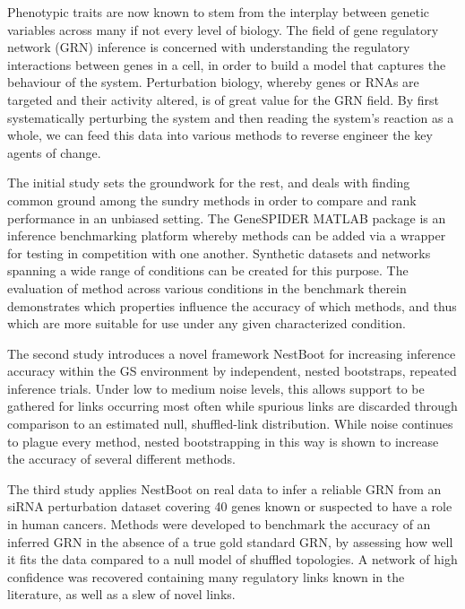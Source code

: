 
\begin{abstracts}

Phenotypic traits are now known to stem from the interplay between genetic variables across many if not every level of biology. The field of gene regulatory network (GRN) inference is concerned with understanding the regulatory interactions between genes in a cell, in order to build a model that captures the behaviour of the system. Perturbation biology, whereby genes or RNAs are targeted and their activity altered, is of great value for the GRN field. By first systematically perturbing the system and then reading the system's reaction as a whole, we can feed this data into various methods to reverse engineer the key agents of change. 

The initial study sets the groundwork for the rest, and deals with finding common ground among the sundry methods in order to compare and rank performance in an unbiased setting. The GeneSPIDER MATLAB package is an inference benchmarking platform whereby methods can be added via a wrapper for testing in competition with one another. Synthetic datasets and networks spanning a wide range of conditions can be created for this purpose. The evaluation of method across various conditions in the benchmark therein demonstrates which properties influence the accuracy of which methods, and thus which are more suitable for use under any given characterized condition.

The second study introduces a novel framework NestBoot for increasing inference accuracy within the GS environment by independent, nested bootstraps, \ie repeated inference trials. Under low to medium noise levels, this allows support to be gathered for links occurring most often while spurious links are discarded through comparison to an estimated null, shuffled-link distribution. While noise continues to plague every method, nested bootstrapping in this way is shown to increase the accuracy of several different methods.

The third study applies NestBoot on real data to infer a reliable GRN from an siRNA perturbation dataset covering 40 genes known or suspected to have a role in human cancers. Methods were developed to benchmark the accuracy of an inferred GRN in the absence of a true gold standard GRN, by assessing how well it fits the data compared to a null model of shuffled topologies. A network of high confidence was recovered containing many regulatory links known in the literature, as well as a slew of novel links.


\end{abstracts}
